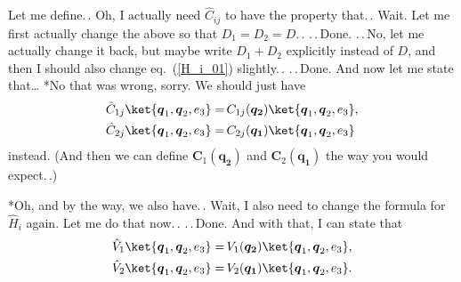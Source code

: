 \documentclass{report}
\begin{document}
Let me define.\,. Oh, I actually need $\hat C_{ij}$ to have the property that.\,. Wait. Let me first actually change the above so that $D_1 = D_2 = D$.\,. .\,.\,Done. .\,.\,No, let me actually change it back, but maybe write $D_1 + D_2$ explicitly instead of $D$, and then I should also change eq.\ (\ref{H_i_01}) slightly.\,. .\,.\,Done. And now let me state that\ldots
*No that was wrong, sorry. We should just have
\begin{align}
\begin{aligned}
	\hat C_{1j} \ket{\boldsymbol{q}_1, \boldsymbol{q}_2, e_3} =&\,
		C_{1j}(\boldsymbol{q_2})
		\ket{\boldsymbol{q}_1, \boldsymbol{q}_2, e_3}, \\
	\hat C_{2j} \ket{\boldsymbol{q}_1, \boldsymbol{q}_2, e_3} =&\,
		C_{2j}(\boldsymbol{q_1})
		\ket{\boldsymbol{q}_1, \boldsymbol{q}_2, e_3}
\end{aligned}
\end{align}
instead. (And then we can define $\boldsymbol{C}_1(\boldsymbol{q_2})$ and $\boldsymbol{C}_2(\boldsymbol{q_1})$ the way you would expect.\,.)

*Oh, and by the way, we also have.\,. Wait, I also need to change the formula for $\hat H_{i}$ again. Let me do that now.\,. .\,.\,Done. And with that, I can state that
\begin{align}
\begin{aligned}
	\hat V_{1} \ket{\boldsymbol{q}_1, \boldsymbol{q}_2, e_3} =&\,
		V_{1}(\boldsymbol{q_2})
		\ket{\boldsymbol{q}_1, \boldsymbol{q}_2, e_3}, \\
	\hat V_{2} \ket{\boldsymbol{q}_1, \boldsymbol{q}_2, e_3} =&\,
		V_{2}(\boldsymbol{q_1})
		\ket{\boldsymbol{q}_1, \boldsymbol{q}_2, e_3}.
\end{aligned}
\end{align}
\end{document}
